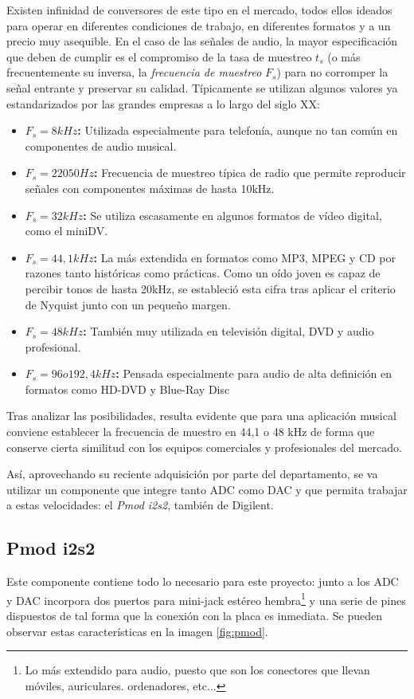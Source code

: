 Existen infinidad de conversores de este tipo en el mercado, todos ellos ideados para operar en diferentes condiciones de trabajo, en diferentes formatos y a un precio muy asequible. En el caso de las señales de audio, la mayor especificación que deben de cumplir es el compromiso de la tasa de muestreo $t_{s}$ (o más frecuentemente su inversa, la \emph{frecuencia de muestreo} $F_{s}$) para no corromper la señal entrante y preservar su calidad. Típicamente se utilizan algunos valores ya estandarizados por las grandes empresas a lo largo del siglo XX:

\begin{itemize}
\item \textbf{$F_{s} = 8kHz$:} Utilizada especialmente para telefonía, aunque no tan común en componentes de audio musical.
\item \textbf{$F_{s} = 22050Hz$:} Frecuencia de muestreo típica de radio que permite reproducir señales con componentes máximas de hasta 10kHz.
\item \textbf{$F_{s} = 32kHz$:} Se utiliza escasamente en algunos formatos de vídeo digital, como el miniDV.
\item \textbf{$F_{s} = 44,1kHz$:} La más extendida en formatos como MP3, MPEG y CD por razones tanto históricas como prácticas. Como un oído joven es capaz de percibir tonos de hasta 20kHz, se estableció esta cifra tras aplicar el criterio de Nyquist junto con un pequeño margen.
\item \textbf{$F_{s} = 48kHz$:} También muy utilizada en televisión digital, DVD y audio profesional.
\item \textbf{$F_{s} = 96 o 192,4kHz$:} Pensada especialmente para audio de alta definición en formatos como HD-DVD y Blue-Ray Disc
\end{itemize}

Tras analizar las posibilidades, resulta evidente que para una aplicación musical conviene establecer la frecuencia de muestro en 44,1 o 48 kHz de forma que conserve cierta similitud con los equipos comerciales y profesionales del mercado.

Así, aprovechando su reciente adquisición por parte del departamento, se va utilizar un componente que integre tanto ADC como DAC y que permita trabajar a estas velocidades: el \emph{Pmod i2s2}, también de Digilent.

\subsection{Pmod i2s2}
Este componente contiene todo lo necesario para este proyecto: junto a los ADC y DAC incorpora dos puertos para mini-jack estéreo hembra\footnote{Lo más extendido para audio, puesto que son los conectores que llevan móviles, auriculares. ordenadores, etc...} y una serie de pines dispuestos de tal forma que la conexión con la placa es inmediata. Se pueden observar estas características en la imagen \ref{fig:pmod}.

